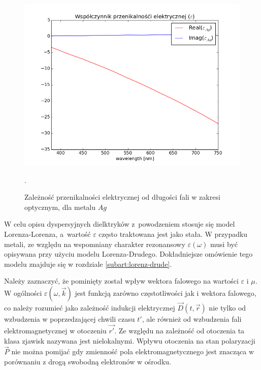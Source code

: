 \begin{figure}[tb]
	\includegraphics[width=\textwidth]{images/agtio2eps.png}
	\caption{Zależność przenikalności elektrycznej od długości fali w zakresi optycznym, dla metalu $Ag$ \cite{PhysRevB.6.4370} }.  
	\label{fig:agtio2eps}
\end{figure}
W celu opisu dyspersyjnych dielktryków z~powodzeniem stosuje się model Lorenza-Lorenza, a~wartość $\varepsilon$ często traktowana jest jako stała. W przypadku metali, ze względu na wspomniany charakter rezonansowy $\varepsilon(\omega)$  musi być opisywana przy użyciu modelu Lorenza-Drudego. Dokładniejsze omówienie tego modelu znajduje się w rozdziale \ref{subart:lorenz-drude}.

Należy zaznaczyć, że pominięty został wpływ wektora falowego na wartości $\varepsilon$ i $\mu$. W ogólności $\varepsilon(\omega,\vec{k})$ jest funkcją zarówno częstotliwości jak i wektora falowego, co należy rozumieć jako zależność indukcji elektrycznej $\vec{D}(t,\vec{r})$ nie tylko od wzbudzenia w poprzedzającej chwili czasu $t'$, ale również od wzbudzenia fali elektromagnetycznej w otoczeniu $\vec{r'}$. Ze względu na zależność od otoczenia ta klasa zjawisk nazywana jest nielokalnymi. Wpływu otoczenia na stan polaryzacji $\vec{P}$ nie można pomijać gdy zmienność pola elektromagnetycznego jest znacząca w porównaniu z drogą swobodną elektronów w ośrodku.




